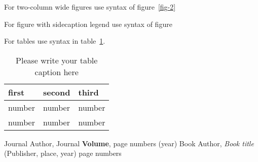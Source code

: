 \documentclass[twocolumn]{webofc}
\begin{document}

For two-column wide figures use syntax of figure~\ref{fig-2}
\begin{figure*}
\centering
\vspace*{5cm}       %
\caption{Please write your figure caption here}
\label{fig-2}       %
\end{figure*}

For figure with sidecaption legend use syntax of figure

For tables use syntax in table~\ref{tab-1}.
\begin{table}
\centering
\caption{Please write your table caption here}
\label{tab-1}       %
\begin{tabular}{lll}
\hline
first & second & third  \\\hline
number & number & number \\
number & number & number \\\hline
\end{tabular}
\vspace*{5cm}  %
\end{table}
%
% 
%
%
\begin{thebibliography}{}
%
%
Journal Author, Journal \textbf{Volume}, page numbers (year)
Book Author, \textit{Book title} (Publisher, place, year) page numbers
\end{thebibliography}
\end{document}
